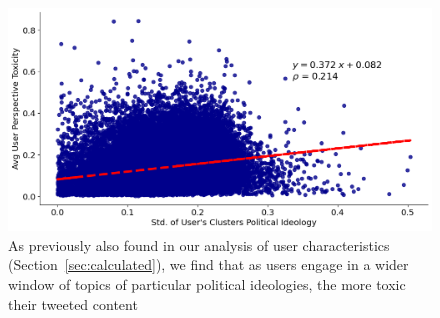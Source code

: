 \begin{figure}
\begin{minipage}[l]{0.48\textwidth}
\includegraphics[width=1\columnwidth]{figures/toxicity_vs_cluster_std.png} 
\end{minipage}
\begin{minipage}[l]{0.48\textwidth}
\caption{As previously also found in our analysis of user characteristics (Section~\ref{sec:calculated}), we find that as users engage in a wider window of topics of particular political ideologies, the more toxic their tweeted content\label{fig:toxicity-vs-var}}
\end{minipage}

\end{figure}







